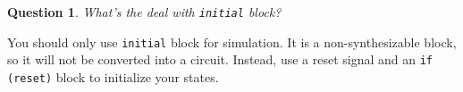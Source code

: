 \documentclass{article}
\newtheorem{question}{Question}
\begin{document}
\begin{question}
  What's the deal with \lstinline[style=verilog-style]{initial} block?
\end{question}
You should only use \lstinline[style=verilog-style]{initial} block for
simulation. It is a non-synthesizable block, so it will not be converted into a
circuit. Instead, use a reset signal and an \lstinline[style=verilog-style]{if (reset)}
block to initialize your states.
\end{document}
